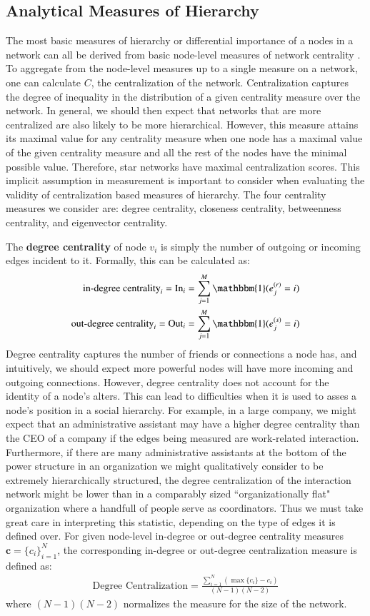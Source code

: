 \documentclass[3p,times]{elsarticle}
\begin{document}
\subsection{Analytical Measures of Hierarchy}
The most basic measures of hierarchy or differential importance of a nodes in a network can all be derived from basic node-level measures of network centrality \cite{Wasserman1994}. To aggregate from the node-level measures up to a single measure on a network, one can calculate $C$, the centralization of the network. Centralization captures the degree of inequality in the distribution of a given centrality measure over the network. In general, we should then expect that networks that are more centralized are also likely to be more hierarchical. However, this measure attains its maximal value for any centrality measure when one node has a maximal value of the given centrality measure and all the rest of the nodes have the minimal possible value. Therefore, star networks have maximal centralization scores. This implicit assumption in measurement is important to consider when evaluating the validity of centralization based measures of hierarchy. The four centrality measures we consider are: degree centrality, closeness centrality, betweenness centrality, and eigenvector centrality. 

The \textbf{degree centrality} of node $v_{i}$ is simply the number of outgoing or incoming edges incident to it. Formally, this can be calculated as:
\begin{align}
	\text{in-degree centrality}_i = \text{In}_i&= \sum_{j=1}^M \mathbbm{1}(e_j^{(r)} = i) \\
	\text{out-degree centrality}_i  = \text{Out}_i &= \sum_{j=1}^M \mathbbm{1}(e_j^{(s)} = i) 
\end{align}
Degree centrality captures the number of friends or connections a node has, and intuitively, we should expect more powerful nodes will have more incoming and outgoing connections. However, degree centrality does not account for the identity of a node's alters. This can lead to difficulties when it is used to asses a node's position in a social hierarchy. For example, in a large company, we might expect that an administrative assistant may have a higher degree centrality than the CEO of a company if the edges being measured are work-related interaction. Furthermore, if there are many administrative assistants at the bottom of the power structure in an organization we might qualitatively consider to be extremely hierarchically structured, the degree centralization of the interaction network might be lower than in a comparably sized ``organizationally flat" organization where a handfull of people serve as coordinators. Thus we must take great care in interpreting this statistic, depending on the type of edges it is defined over. For given node-level in-degree or out-degree centrality measures $\mathbf{c} = \{c_i\}_{i=1}^N$, the corresponding in-degree or out-degree centralization measure is defined as: 
\begin{align}
	\text{Degree Centralization} = \frac{\sum_{i=1}^{N}{(\max\{c_{i}\}-c_{i})}}{(N-1)(N-2)}
\end{align}
where $(N-1)(N-2)$ normalizes the measure for the size of the network.
\end{document}
